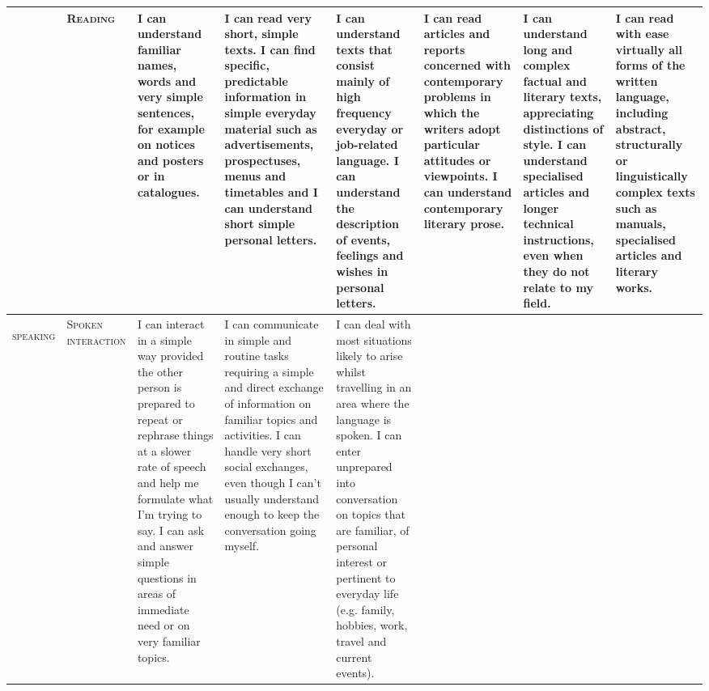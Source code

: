 \begin{tabular}{|c|p{1.5cm}|p{2cm}|p{2cm}|p{2cm}|p{2cm}|p{2cm}|p{2cm}|}
& \small\scshape Reading &

\scriptsize I can understand
familiar names,
words and very
simple sentences,
for example on
notices and posters
or in catalogues. &

\scriptsize I can read very
short, simple texts.
I can find specific,
predictable
information in
simple everyday
material such as
advertisements,
prospectuses,
menus and
timetables and I
can understand
short simple
personal letters. &

\scriptsize I can understand
texts that consist
mainly of high
frequency
everyday or
job-related
language. I can
understand the
description of
events, feelings
and wishes in
personal letters. &

\scriptsize I can read articles
and reports
concerned with
contemporary
problems in which
the writers adopt
particular attitudes
or viewpoints. I
can understand
contemporary
literary prose. &

\scriptsize I can understand
long and complex
factual and literary
texts, appreciating
distinctions of
style. I can
understand
specialised articles
and longer
technical
instructions, even
when they do not
relate to my field. &

\scriptsize I can read with
ease virtually all
forms of the written
language, including
abstract,
structurally or
linguistically
complex texts such
as manuals,
specialised articles
and literary works. \\ \hline

\multirow{2}{*}{\begin{sideways}\Large\scshape speaking\end{sideways}} &

\small\scshape Spoken interaction &

\scriptsize I can interact in a
simple way
provided the other
person is prepared
to repeat or
rephrase things at
a slower rate of
speech and help
me formulate what
I'm trying to say. I
can ask and
answer simple
questions in areas
of immediate need
or on very familiar
topics. &

\scriptsize I can communicate
in simple and
routine tasks
requiring a simple
and direct
exchange of
information on
familiar topics and
activities. I can
handle very short
social exchanges,
even though I can't
usually understand
enough to keep the
conversation going
myself. &

\scriptsize I can deal with
most situations
likely to arise
whilst travelling in
an area where the
language is
spoken. I can enter
unprepared into
conversation on
topics that are
familiar, of
personal interest
or pertinent to
everyday life (e.g.
family, hobbies,
work, travel and
current events). &


\end{tabular}
